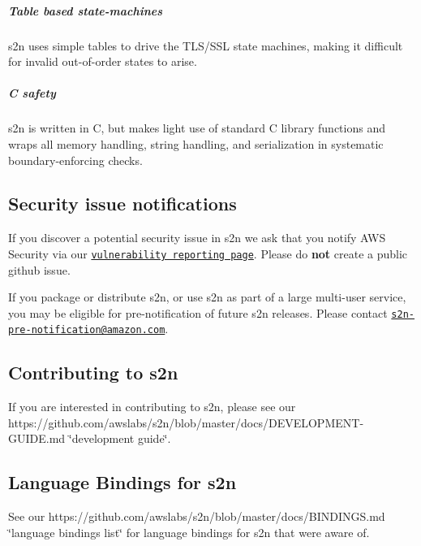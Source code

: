\subparagraph*{Table based state-\/machines}

s2n uses simple tables to drive the T\+L\+S/\+S\+SL state machines, making it difficult for invalid out-\/of-\/order states to arise.

\subparagraph*{C safety}

s2n is written in C, but makes light use of standard C library functions and wraps all memory handling, string handling, and serialization in systematic boundary-\/enforcing checks.

\subsection*{Security issue notifications}

If you discover a potential security issue in s2n we ask that you notify A\+WS Security via our \href{http://aws.amazon.com/security/vulnerability-reporting/}{\tt vulnerability reporting page}. Please do {\bfseries not} create a public github issue.

If you package or distribute s2n, or use s2n as part of a large multi-\/user service, you may be eligible for pre-\/notification of future s2n releases. Please contact \href{mailto:s2n-pre-notification@amazon.com}{\tt s2n-\/pre-\/notification@amazon.\+com}.

\subsection*{Contributing to s2n}

If you are interested in contributing to s2n, please see our https\+://github.com/awslabs/s2n/blob/master/docs/\+D\+E\+V\+E\+L\+O\+P\+M\+E\+N\+T-\/\+G\+U\+I\+D\+E.\+md \char`\"{}development guide\char`\"{}.

\subsection*{Language Bindings for s2n}

See our https\+://github.com/awslabs/s2n/blob/master/docs/\+B\+I\+N\+D\+I\+N\+G\+S.\+md \char`\"{}language bindings list\char`\"{} for language bindings for s2n that we\textquotesingle{}re aware of. 